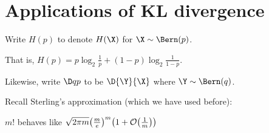 \documentclass[class=co432,notes,tikz]{agony}
\begin{document}
\chapter{Applications of KL divergence}

\begin{notation}
  Write $H(p)$ to denote $H(\X)$ for $\X \sim \Bern(p)$.

  That is, $H(p) = p\log_2\frac1p + (1-p)\log_2\frac{1}{1-p}$.

  Likewise, write $\D q p$ to be $\D{\Y}{\X}$
  where $\Y \sim \Bern(q)$.
\end{notation}

Recall Sterling's approximation (which we have used before):

\begin{theorem}\label{thm:sterling}
  $m!$ behaves like $\sqrt{2\pi m}\qty(\frac{m}{e})^m\qty(1+\order{\frac{1}{m}})$
\end{theorem}
\end{document}
